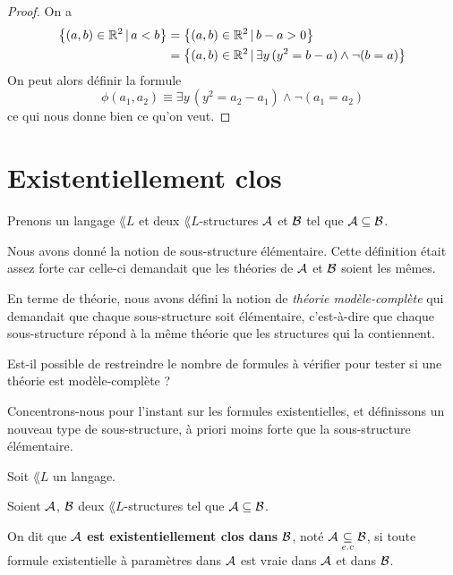 \documentclass[a4paper, 12pt]{report}
\begin{document}
\ifdefined\outputproof
\begin{proof}
	On a
	\begin{align}
		\left\{(a, b) \in \mathbb{R}^{2} \, | \, a < b \right\} & = \left\{(a, b) \in
			\mathbb{R}^{2} \, | \, b - a > 0 \right\} \\
			& = \left\{(a, b) \in \mathbb{R}^{2} \, | \, \exists y \, (y^{2} = b - a)
		\wedge \neg(b = a) \right\}
	\end{align}
	On peut alors définir la formule
	\begin{equation}
		\phi(a_{1}, a_{2}) \equiv \exists y \, (y^{2} = a_{2} - a_{1}) \wedge
		\neg (a_{1} = a_{2})
	\end{equation}
	ce qui nous donne bien ce qu'on veut.
\end{proof}
\fi

\chapter{Existentiellement clos}

Prenons un langage $\lang{L}$ et deux $\lang{L}$-structures $\mathcal{A}$ et
$\mathcal{B}$ tel que $\mathcal{A} \subseteq \mathcal{B}$.

Nous avons donné la notion de sous-structure élémentaire. Cette définition
était assez forte car celle-ci demandait que les théories de $\mathcal{A}$ et
$\mathcal{B}$ soient les mêmes.

En terme de théorie, nous avons défini la notion de \textit{théorie
modèle-complète} qui demandait que chaque sous-structure soit élémentaire,
c'est-à-dire que chaque sous-structure répond à la même théorie que les
structures qui la contiennent.

Est-il possible de restreindre le nombre de formules à vérifier pour tester si
une théorie est modèle-complète ?

Concentrons-nous pour l'instant sur les formules existentielles, et définissons
un nouveau type de sous-structure, à priori moins forte que la sous-structure élémentaire.

\begin{definition} 
	Soit $\lang{L}$ un langage.

	Soient $\mathcal{A}$, $\mathcal{B}$ deux $\lang{L}$-structures tel que
	$\mathcal{A} \subseteq \mathcal{B}$.

	On dit que \textbf{$\mathcal{A}$ est existentiellement clos dans
	$\mathcal{B}$}, noté $\mathcal{A} \underset{e.c}{\subseteq} \mathcal{B}$, si toute
	formule existentielle à paramètres dans $\mathcal{A}$ est vraie dans
	$\mathcal{A}$ et dans $\mathcal{B}$.
\end{definition}
\end{document}

